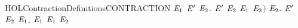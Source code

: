 \begin{SaveVerbatim}{HOLContractionDefinitionsCONTRACTION}
                 \ensuremath{\HOLBoundVar{E}\sb{\mathrm{1}}} \ensuremath{\HOLBoundVar{E}\sp{\prime}} \HOLSymConst{\HOLTokenDisj{}} \HOLSymConst{\HOLTokenExists{}}\ensuremath{\HOLBoundVar{E}\sb{\mathrm{2}}}. \ensuremath{\HOLBoundVar{E}\sp{\prime}} \HOLTokenTransBegin\HOLConst{\ensuremath{\tau}}\HOLTokenTransEnd \ensuremath{\HOLBoundVar{E}\sb{\mathrm{2}}} \HOLSymConst{\HOLTokenConj{}}  \ensuremath{\HOLBoundVar{E}\sb{\mathrm{1}}} \ensuremath{\HOLBoundVar{E}\sb{\mathrm{2}}}\ensuremath{)} \HOLSymConst{\HOLTokenConj{}}
           \HOLSymConst{\HOLTokenForall{}}\ensuremath{\HOLBoundVar{E}\sb{\mathrm{2}}}. \ensuremath{\HOLBoundVar{E}\sp{\prime}} \HOLTokenTransBegin\HOLConst{\ensuremath{\tau}}\HOLTokenTransEnd \ensuremath{\HOLBoundVar{E}\sb{\mathrm{2}}} \HOLSymConst{\HOLTokenImp{}} \HOLSymConst{\HOLTokenExists{}}\ensuremath{\HOLBoundVar{E}\sb{\mathrm{1}}}.   \ensuremath{\HOLBoundVar{E}\sb{\mathrm{1}}} \HOLSymConst{\HOLTokenConj{}}  \ensuremath{\HOLBoundVar{E}\sb{\mathrm{1}}} \ensuremath{\HOLBoundVar{E}\sb{\mathrm{2}}}
\end{SaveVerbatim}
\newcommand{\HOLContractionDefinitionsCONTRACTION}{\UseVerbatim{HOLContractionDefinitionsCONTRACTION}}
